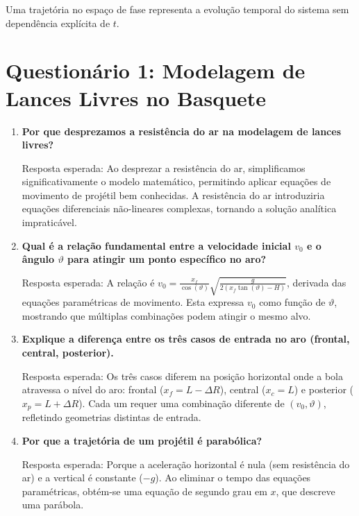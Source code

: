 \documentclass[12pt,a4paper]{article}
\begin{document}
Uma trajetória no espaço de fase representa a evolução temporal do sistema sem dependência explícita de $t$.

\newpage


\section{Questionário 1: Modelagem de Lances Livres no Basquete}

\begin{enumerate}
    \item \textbf{Por que desprezamos a resistência do ar na modelagem de lances livres?} \par
    Resposta esperada: Ao desprezar a resistência do ar, simplificamos significativamente o modelo matemático, permitindo aplicar equações de movimento de projétil bem conhecidas. A resistência do ar introduziria equações diferenciais não-lineares complexas, tornando a solução analítica impraticável.
    
    \item \textbf{Qual é a relação fundamental entre a velocidade inicial $v_0$ e o ângulo $\vartheta$ para atingir um ponto específico no aro?} \par
    Resposta esperada: A relação é $v_0 = \frac{x_f}{\cos(\vartheta)}\sqrt{\frac{g}{2(x_f \tan(\vartheta) - H)}}$, derivada das equações paramétricas de movimento. Esta expressa $v_0$ como função de $\vartheta$, mostrando que múltiplas combinações podem atingir o mesmo alvo.
    
    \item \textbf{Explique a diferença entre os três casos de entrada no aro (frontal, central, posterior).} \par
    Resposta esperada: Os três casos diferem na posição horizontal onde a bola atravessa o nível do aro: frontal ($x_f = L - \Delta R$), central ($x_c = L$) e posterior ($x_p = L + \Delta R$). Cada um requer uma combinação diferente de $(v_0, \vartheta)$, refletindo geometrias distintas de entrada.
    
    \item \textbf{Por que a trajetória de um projétil é parabólica?} \par
    Resposta esperada: Porque a aceleração horizontal é nula (sem resistência do ar) e a vertical é constante ($-g$). Ao eliminar o tempo das equações paramétricas, obtém-se uma equação de segundo grau em $x$, que descreve uma parábola.
    

\end{enumerate}
\end{document}

